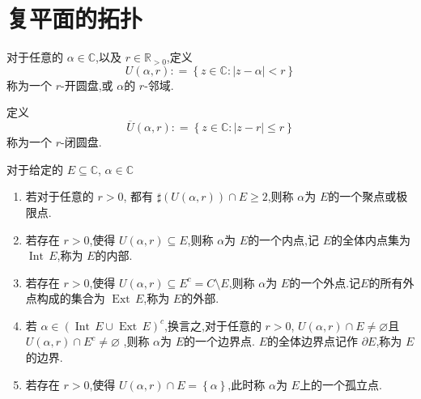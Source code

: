 \documentclass[../../复变函数.tex]{subfiles}
\begin{document}
\chapter{复平面的拓扑}
    

\begin{definition}  
    对于任意的 \(  \alpha  \in \mathbb{C}   \),以及 \(  r \in \mathbb{R} _{>0}  \),定义 \[
    U\left(  \alpha ,r \right): =  \left\{ z \in \mathbb{C} : \left| z-\alpha  \right|<r  \right\} 
    \]  称为一个 \(  r  \)-开圆盘,或 \(   \alpha   \)的 \(  r  \)-邻域.
    
    定义 \[
    \overline{U} \left( \alpha ,r \right): =  \left\{ z \in \mathbb{C} : \left| z-r \right|\le r  \right\} 
    \]称为一个 \(  r  \)-闭圆盘. 
\end{definition}

\begin{definition}
    对于给定的 \(  E\subseteq \mathbb{C}   \), \(  \alpha  \in \mathbb{C}   \)  
    \begin{enumerate}
        \item 若对于任意的 \(  r>0  \),
       都有 \(  \sharp (U\left( \alpha ,r \right) )\cap E\ge 2  \),则称 \(  \alpha   \)为 \(  E  \)的一个聚点或极限点. 
        \item 若存在 \(  r>0  \),使得 \(  U\left( \alpha ,r \right)\subseteq E   \),则称 \(  \alpha   \)为 \(  E  \)的一个内点,记 \(  E  \)的全体内点集为 \(  \operatorname{Int}\,E  \),称为 \(  E  \)的内部.   
        \item 若存在 \(  r>0  \),使得 \(  U\left( \alpha ,r \right)\subseteq E^{c}=  C\setminus E   \),则称 \(  \alpha   \)为 \(  E  \)的一个外点.记\(  E  \)的所有外点构成的集合为 \(  \operatorname{Ext}\,E  \),称为 \(  E  \)的外部.
        \item 若  \(  \alpha  \in \left( \operatorname{Int}\,E \cup \operatorname{Ext}\,E \right)^{c}   \),换言之,对于任意的 \(  r>0  \), \(  U\left( \alpha ,r \right)\cap  E \neq \varnothing   \)且 \(  U\left( \alpha ,r \right)\cap E^{c} \neq  \varnothing   \)   ,则称 \(  \alpha   \)为 \(  E  \)的一个边界点. \(  E  \)的全体边界点记作 \(  \partial E  \),称为 \(  E  \)的边界.   
        \item 若存在 \(  r>0  \),使得 \(  U\left( \alpha ,r \right)\cap E =  \left\{ \alpha  \right\}   \),此时称 \(  \alpha   \)为 \(  E  \)上的一个孤立点.                 
    \end{enumerate}
        
\end{definition}
\end{document}
